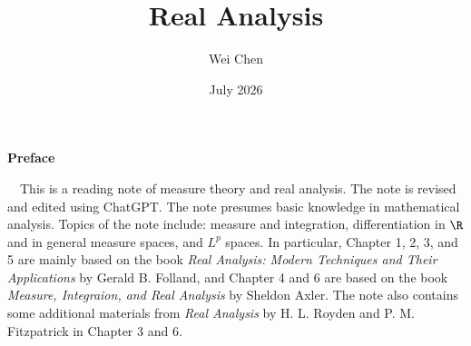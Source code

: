 \documentclass[11pt,oneside]{book}
\title{\Huge \textbf{Real Analysis}}
\author{Wei Chen}
\date{July 2026}
\theoremstyle{mystyle}
\newcommand{\1}{\mathbf{1}}
\begin{document}
\maketitle
	\allowdisplaybreaks
	\setcounter{page}{1}
	\begin{center}
		\Large\textbf{Preface}
    \end{center}~\
    This is a reading note of measure theory and real analysis. The note is revised and edited using ChatGPT. The note presumes basic knowledge in mathematical analysis. Topics of the note include: measure and integration, differentiation in $\R$ and in general measure spaces, and $L^p$ spaces. In particular, Chapter 1, 2, 3, and 5 are mainly based on the book \textit{Real Analysis: Modern Techniques and Their Applications} by Gerald B. Folland, and Chapter 4 and 6 are based on the book \textit{Measure, Integraion, and Real Analysis} by Sheldon Axler. The note also contains some additional materials from \textit{Real Analysis} by H. L. Royden and P. M. Fitzpatrick in Chapter 3 and 6.
\frontmatter
\hypersetup{pageanchor=false}
\maketitle
\clearpage
\hypersetup{pageanchor=true}
\setcounter{page}{1}
\tableofcontents


\mainmatter






\end{document}
